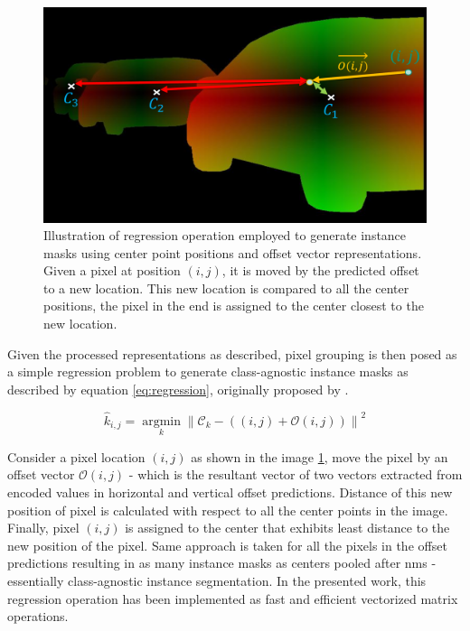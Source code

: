 \begin{figure}[!ht]
    \includegraphics[width = \textwidth]{Graphics/Methodology/instance_regression.pdf}
    \caption[Regression Approach to Generate Instance Masks]{Illustration of regression operation employed to generate instance masks using center point positions and offset vector representations. Given a pixel at position $(i,j)$, it is moved by the predicted offset to a new location. This new location is compared to all the center positions, the pixel in the end is assigned to the center closest to the new location.}
    \label{fig:regression_approach}
\end{figure}

Given the processed representations as described, pixel grouping is then posed as a simple regression problem to generate class-agnostic instance masks as described by equation \ref{eq:regression}, originally proposed by \cite{Deeplabv3+:journals/corr/abs-1802-02611}.

\begin{equation}\hat{k}_{i, j}=\underset{k}{\operatorname{argmin}}\left\|\mathcal{C}_{k}-((i, j)+\mathcal{O}(i, j))\right\|^{2}
\label{eq:regression}
\end{equation}

Consider a pixel location $(i,j)$ as shown in the image \ref{fig:regression_approach}, move the pixel by an offset vector $\mathcal{O}(i,j)$ - which is the resultant vector of two vectors extracted from encoded values in horizontal and vertical offset predictions. Distance of this new position of pixel is calculated with respect to all the center points in the image. Finally, pixel $(i,j)$ is assigned to the center that exhibits least distance to the new position of the pixel. Same approach is taken for all the pixels in the offset predictions resulting in as many instance masks as centers pooled after \gls{nms} - essentially class-agnostic instance segmentation. In the presented work, this regression operation has been implemented as fast and efficient vectorized matrix operations.







